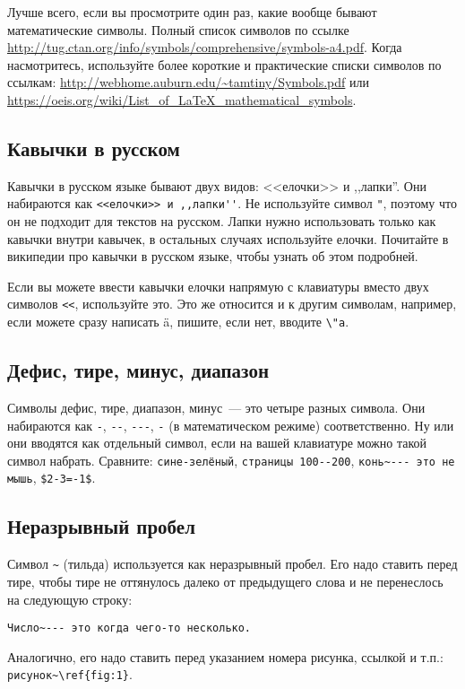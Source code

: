 \documentclass{article}
\begin{document}
    Лучше всего, если вы просмотрите один раз, какие вообще бывают математические символы. Полный список символов
    по ссылке \url{http://tug.ctan.org/info/symbols/comprehensive/symbols-a4.pdf}.
    Когда насмотритесь, используйте более короткие и практические списки символов по ссылкам:
    \url{http://webhome.auburn.edu/~tamtiny/Symbols.pdf} или \url{https://oeis.org/wiki/List_of_LaTeX_mathematical_symbols}.

    \subsection{Кавычки в русском}

    Кавычки в русском языке бывают двух видов: <<елочки>> и ,,лапки''. Они набираются как
    \verb|<<елочки>> и ,,лапки''|. Не используйте символ \verb|"|, поэтому что он не подходит
    для текстов на русском. Лапки нужно использовать только как кавычки внутри кавычек, в остальных случаях
    используйте елочки. Почитайте в википедии про кавычки в русском языке, чтобы узнать об этом подробней.

    Если вы можете ввести кавычки елочки напрямую с клавиатуры вместо двух символов \verb|<<|, используйте это.
    Это же относится и к другим символам, например, если можете сразу написать ä, пишите, если нет, вводите \verb|\"a|.

    \subsection{Дефис, тире, минус, диапазон}

    Символы дефис, тире, диапазон, минус~--- это четыре разных символа. Они набираются как
    \verb|-|, \verb|--|, \verb|---|, \verb|-| (в математическом режиме) соответственно.
    Ну или они вводятся как отдельный символ, если на вашей клавиатуре можно такой символ
    набрать. Сравните: \verb|сине-зелёный|, \verb|страницы 100--200|,
    \verb|конь~--- это не мышь|, \verb|$2-3=-1$|.

    \subsection{Неразрывный пробел}

    Символ \verb|~| (тильда) используется как неразрывный пробел.
    Его надо ставить перед тире, чтобы тире не оттянулось далеко от предыдущего слова и не перенеслось на следующую строку:
    \begin{verbatim}Число~--- это когда чего-то несколько.\end{verbatim}
    Аналогично, его надо ставить перед указанием номера рисунка, ссылкой и т.п.: \verb|рисунок~\ref{fig:1}|.
\end{document}
